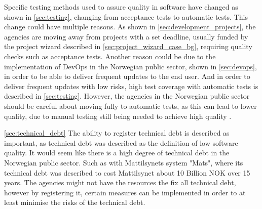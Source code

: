 Specific testing methods used to assure quality in software have changed as shown in \autoref{sec:testing}, changing from acceptance tests to automatic tests. This change could have multiple reasons. As shown in \autoref{sec:development_projects}, the agencies are moving away from projects with a set deadline, usually funded by the project wizard described in \autoref{sec:project_wizard_case_bg}, requiring quality checks such as acceptance tests. Another reason could be due to the implementation of DevOps in the Norwegian public sector, shown in \autoref{sec:devops}, in order to be able to deliver frequent updates to the end user. And in order to deliver frequent updates with low risks, high test coverage with automatic tests is described in \autoref{sec:testing}. However, the agencies in the Norwegian public sector should be careful about moving fully to automatic tests, as this can lead to lower quality, due to manual testing still being needed to achieve high quality \cite{dsc_2019}. 


\autoref{sec:technical_debt} The ability to register technical debt is described as important, as technical debt was described as the definition of low software quality. It would seem like there is a high degree of technical debt in the Norwegian public sector. Such as with Mattilsynets system "Mats", where its technical debt was described to cost Mattilsynet about 10 Billion NOK over 15 years. The agencies might not have the resources the fix all technical debt, however by registering it, certain measures can be implemented in order to at least minimise the risks of the technical debt. \cite{mv_2022}

